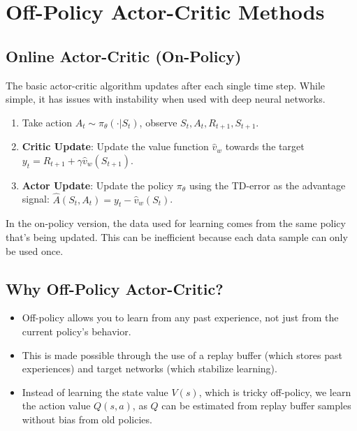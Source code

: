 \documentclass[12pt]{article}
\begin{document}
\section{Off-Policy Actor-Critic Methods }

\subsection{Online Actor-Critic (On-Policy)}
The basic actor-critic algorithm updates after each single time step. While simple, it has issues with instability when used with deep neural networks.

\begin{enumerate}
    \item Take action $A_t \sim \pi_\theta(\cdot|S_t)$, observe $S_t, A_t, R_{t+1}, S_{t+1}$.
    \item \textbf{Critic Update}: Update the value function $\hat{v}_w$ towards the target $y_t = R_{t+1} + \gamma \hat{v}_w(S_{t+1})$.
    \item \textbf{Actor Update}: Update the policy $\pi_\theta$ using the TD-error as the advantage signal: $\hat{A}(S_t, A_t) = y_t - \hat{v}_w(S_t)$.
\end{enumerate}

In the on-policy version, the data used for learning comes from the same policy that’s being updated. This can be inefficient because each data sample can only be used once.

\subsection{Why Off-Policy Actor-Critic?}

\begin{itemize}
    \item Off-policy allows you to learn from any past experience, not just from the current policy's behavior.
    \item This is made possible through the use of a replay buffer (which stores past experiences) and target networks (which stabilize learning).
    \item Instead of learning the state value $V(s)$, which is tricky off-policy, we learn the action value $Q(s,a)$, as $Q$ can be estimated from replay buffer samples without bias from old policies.
\end{itemize}
\end{document}
